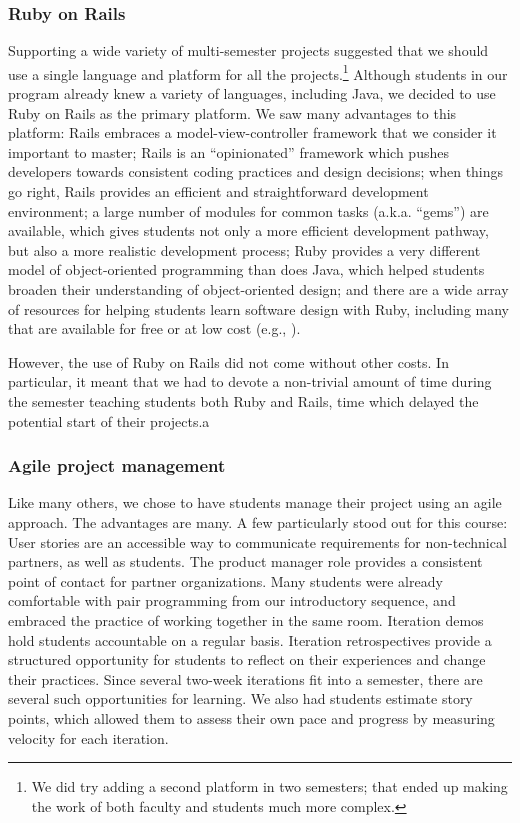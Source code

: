 
\subsubsection{Ruby on Rails}

Supporting a wide variety of multi-semester projects suggested that
we should use a single language and platform for all the
projects.\footnote{We did try adding a second platform in two
semesters; that ended up making the work of both faculty and students
much more complex.}  Although students in our program already knew
a variety of languages, including Java, we decided to use Ruby on
Rails as the primary platform.  We saw many advantages to this
platform: Rails embraces a model-view-controller framework that we
consider it important to master; Rails is an ``opinionated'' framework 
which pushes developers towards consistent coding practices and 
design decisions; when things go right, Rails
provides an efficient and straightforward development environment;
a large number of modules for common tasks (a.k.a. ``gems'') are
available, which gives students not only a more efficient development
pathway, but also a more realistic development process; Ruby
provides a very different model of object-oriented programming than
does Java, which helped students broaden their understanding of
object-oriented design; and there are a wide array of resources for
helping students learn software design with Ruby, including many
that are available for free or at low cost (e.g.,
\cite{saasbook,rails-tutorial}).

However, the use of Ruby on Rails did not come without other costs.  In
particular, it meant that we had to devote a non-trivial amount of
time during the semester teaching students both Ruby and Rails, time
which delayed the potential start of their projects.a

\subsubsection{Agile project management}

Like many others, we chose to have students manage their project using an 
agile approach.  The advantages are many.  A few particularly stood out
for this course: User stories are an accessible way to communicate
requirements for non-technical partners, as well as students. 
The product manager role provides a consistent point of contact for partner 
organizations.
Many students were already comfortable with pair programming from our 
introductory sequence, and embraced the 
practice of working together in the same room.
Iteration demos 
hold students accountable on a regular basis.  Iteration retrospectives
provide a structured opportunity for students to reflect on their experiences
and change their practices.  Since several two-week iterations fit into a 
semester, there are several such opportunities for learning.
We also had students estimate story points, which allowed them to assess 
their own pace and progress by measuring velocity for each iteration.

